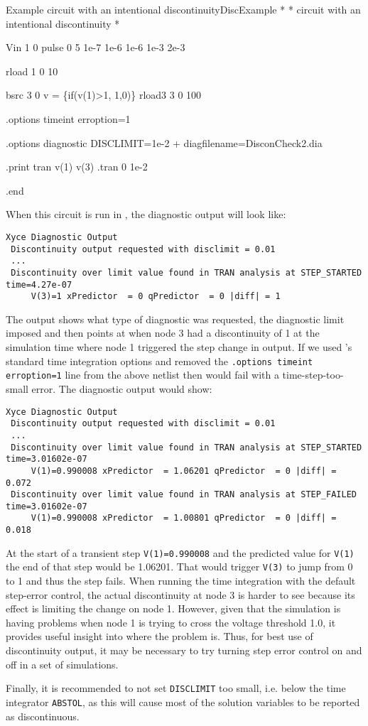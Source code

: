 \begin{NetlistFigure}{Example circuit with an intentional discontinuity}{DiscExample}
*
* circuit with an intentional discontinuity 
*

Vin 1 0 pulse 0 5 1e-7 1e-6 1e-6 1e-3 2e-3

rload 1 0 10


bsrc 3 0 v = \{if(v(1)>1, 1,0)\}
rload3 3 0 100


.options timeint erroption=1

.options diagnostic DISCLIMIT=1e-2 
+ diagfilename=DisconCheck2.dia

.print tran v(1) v(3)
.tran 0 1e-2

.end

\end{NetlistFigure}

\noindent When this circuit is run in \Xyce{}, the diagnostic output will look like:
\begin{verbatim}
Xyce Diagnostic Output
 Discontinuity output requested with disclimit = 0.01
 ...
 Discontinuity over limit value found in TRAN analysis at STEP_STARTED time=4.27e-07
     V(3)=1 xPredictor  = 0 qPredictor  = 0 |diff| = 1
\end{verbatim}

\noindent The output shows what type of diagnostic was requested, the diagnostic limit imposed
and then points at when node 3 had a discontinuity of 1 at the simulation time where
node 1 triggered the step change in output.  If we used \Xyce{}'s standard time integration 
options and removed the \texttt{.options timeint erroption=1} line from the above netlist 
then \Xyce{} would fail with a time-step-too-small error.  The diagnostic output would show:

\begin{verbatim}
Xyce Diagnostic Output
 Discontinuity output requested with disclimit = 0.01
 ...
 Discontinuity over limit value found in TRAN analysis at STEP_STARTED time=3.01602e-07
     V(1)=0.990008 xPredictor  = 1.06201 qPredictor  = 0 |diff| = 0.072
 Discontinuity over limit value found in TRAN analysis at STEP_FAILED time=3.01602e-07
     V(1)=0.990008 xPredictor  = 1.00801 qPredictor  = 0 |diff| = 0.018
\end{verbatim}

At the start of a transient step \texttt{V(1)=0.990008} and the predicted 
value for \texttt{V(1)} the end of that step would be 1.06201.  That would trigger \texttt{V(3)} 
to jump from 0 to 1 and thus the step fails.  When running the time integration with the default 
step-error control, the actual discontinuity at node 3 is harder to see because its effect
is limiting the change on node 1.  However, given that the simulation is having 
problems when node 1 is trying to cross the voltage threshold 1.0, it provides useful insight into
where the problem is.  Thus, for best use of discontinuity output, it may be necessary to try 
turning step error control on and off in a set of simulations.  

Finally, it is recommended to not set \texttt{DISCLIMIT} 
too small, i.e. below the time integrator \texttt{ABSTOL}, as this will cause most of the 
solution variables to be reported as discontinuous. 

\label{SimulationIssues}

